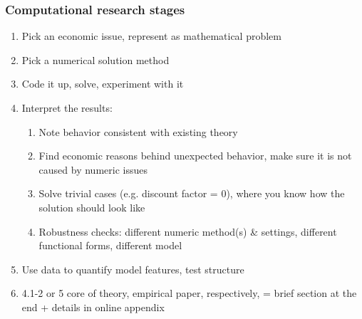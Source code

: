 \documentclass[bigger]{beamer}
\begin{document}
\begin{frame}%

\frametitle{Computational research stages}

\begin{enumerate}
\item Pick an economic issue, represent as mathematical problem

\item Pick a numerical solution method

\item Code it up, solve, experiment with it

\item Interpret the results:

\begin{enumerate}
\item Note behavior consistent with existing theory

\item Find economic reasons behind unexpected behavior,\newline
make sure it is not caused by numeric issues

\item Solve trivial cases (e.g. discount factor = 0), \newline
where you know how the solution should look like

\item Robustness checks: different numeric method(s) \& settings, \newline
different functional forms, different model
\end{enumerate}

\item Use data to quantify model features, test structure 

\item 4.1-2 or 5 core of theory, empirical paper, respectively,  = brief section at the end + details in online appendix
\end{enumerate}

\end{frame}
\end{document}
